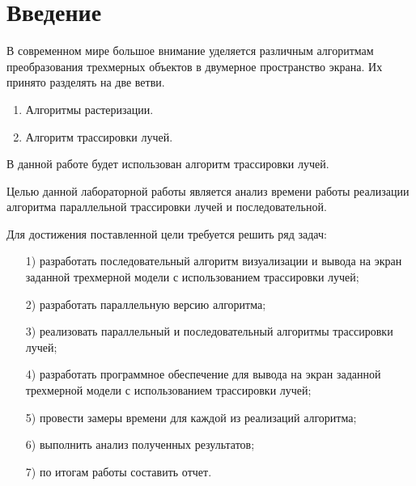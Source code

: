 
\chapter*{Введение}
В современном мире большое внимание уделяется различным алгоритмам преобразования трехмерных объектов в двумерное пространство экрана. Их принято разделять на две ветви.
 
\begin{enumerate}
	\item Алгоритмы растеризации.
	\item Алгоритм трассировки лучей.
\end{enumerate}

В данной работе будет использован алгоритм трассировки лучей.

Целью данной лабораторной работы является анализ времени работы реализации алгоритма параллельной трассировки лучей и последовательной.

Для достижения поставленной цели требуется решить ряд задач:
\begin{enumerate}
	\item[1)] разработать последовательный алгоритм визуализации и вывода на экран заданной трехмерной модели с использованием трассировки лучей;
	\item[2)] разработать параллельную версию алгоритма;
	\item[3)] реализовать параллельный и последовательный алгоритмы трассировки лучей;
	\item[4)] разработать программное обеспечение для вывода на экран заданной трехмерной модели с использованием трассировки лучей;
	\item [5)] провести замеры времени для каждой из реализаций алгоритма;
	\item[6)] выполнить анализ полученных результатов;
	\item [7)] по итогам работы составить отчет.
\end{enumerate}
\newpage
